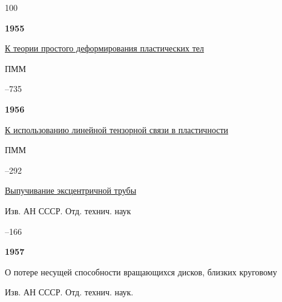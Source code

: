 \begin{thebibliography}{100}



\item[] 

\centerline{\bf 1955}




\paper \href{https://zbmath.org/?q=an:0068.38403}{К теории простого деформирования пластических тел}

\jour ПММ




–735






\item[] \centerline{\bf 1956}




\paper \href{https://zbmath.org/?q=an:0074.40904}{К использованию линейной тензорной связи в пластичности}

\jour ПММ




–292





\paper \href{www.worldcat.org/title/buckling-of-eccentric-pipes/oclc/9939018}{Выпучивание эксцентричной трубы}

\jour Изв. АН СССР. Отд. технич. наук



–166



\item[] \centerline{\bf 1957}




\paper О потере несущей способности вращающихся дисков, близких круговому 

\jour Изв. АН СССР. Отд. технич. наук. 



\end{thebibliography}
